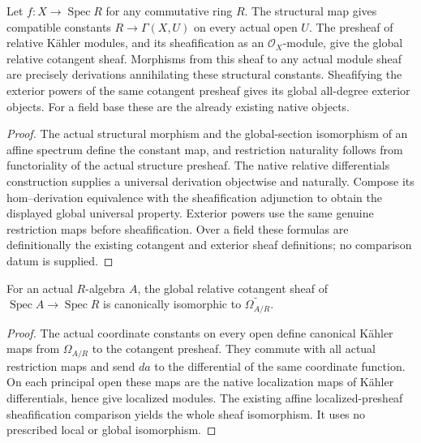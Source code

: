 \begin{theorem}
\label{thm:kn-arithmetic-global-relative-objects}
\leanok
Let $f:X\to\operatorname{Spec}R$ for any commutative ring $R$.  The structural
map gives compatible constants $R\to\Gamma(X,U)$ on every actual open $U$.
The presheaf of relative K\"ahler modules, and its sheafification as an
$\mathcal O_X$-module, give the global relative cotangent sheaf.  Morphisms
from this sheaf to any actual module sheaf are precisely derivations
annihilating these structural constants.  Sheafifying the exterior powers
of the same cotangent presheaf gives its global all-degree exterior objects.
For a field base these are the already existing native objects.
\end{theorem}
\begin{proof}
The actual structural morphism and the global-section isomorphism of an
affine spectrum define the constant map, and restriction naturality follows
from functoriality of the actual structure presheaf.  The native relative
differentials construction supplies a universal derivation objectwise and
naturally.  Compose its hom--derivation equivalence with the sheafification
adjunction to obtain the displayed global universal property.  Exterior
powers use the same genuine restriction maps before sheafification.  Over a
field these formulas are definitionally the existing cotangent and exterior
sheaf definitions; no comparison datum is supplied.
\end{proof}

\begin{theorem}
\label{thm:kn-arithmetic-global-affine-cotangent}
\leanok
{}
For an actual $R$-algebra $A$, the global relative cotangent sheaf of
$\operatorname{Spec}A\to\operatorname{Spec}R$ is canonically isomorphic to
$\widetilde{\Omega_{A/R}}$.
\end{theorem}
\begin{proof}
The actual coordinate constants on every open define canonical K\"ahler maps
from $\Omega_{A/R}$ to the cotangent presheaf.  They commute with all actual
restriction maps and send $da$ to the differential of the same coordinate
function.  On each principal open these maps are the native localization
maps of K\"ahler differentials, hence give localized modules.  The existing
affine localized-presheaf sheafification comparison yields the whole sheaf
isomorphism.  It uses no prescribed local or global isomorphism.
\end{proof}

